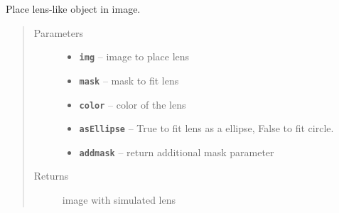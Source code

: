 \documentclass[letterpaper,10pt,english]{sphinxmanual}
\begin{document}

\begin{fulllineitems}
\label{RRtoolbox.tools:RRtoolbox.tools.lens.fitLens}
Place lens-like object in image.
\begin{quote}\begin{description}
\item[{Parameters}] \leavevmode\begin{itemize}
\item {} 
\textbf{\texttt{img}} -- image to place lens

\item {} 
\textbf{\texttt{mask}} -- mask to fit lens

\item {} 
\textbf{\texttt{color}} -- color of the lens

\item {} 
\textbf{\texttt{asEllipse}} -- True to fit lens as a ellipse, False to fit circle.

\item {} 
\textbf{\texttt{addmask}} -- return additional mask parameter

\end{itemize}

\item[{Returns}] \leavevmode
image with simulated lens

\end{description}\end{quote}

\end{fulllineitems}

\end{document}
